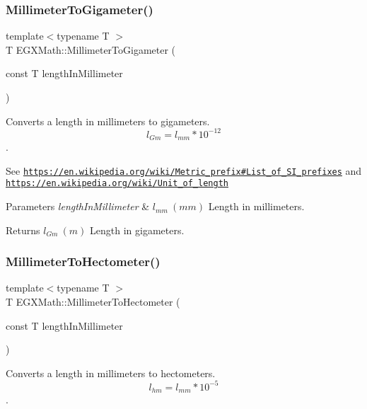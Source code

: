 \subsubsection{\texorpdfstring{Millimeter\+To\+Gigameter()}{MillimeterToGigameter()}}
{\footnotesize\ttfamily template$<$typename T $>$ \\
T E\+G\+X\+Math\+::\+Millimeter\+To\+Gigameter (\begin{DoxyParamCaption}\item[{const T}]{length\+In\+Millimeter }\end{DoxyParamCaption})}



Converts a length in millimeters to gigameters. \[ l_{Gm}=l_{mm} * 10^{-12} \]. 

See \href{https://en.wikipedia.org/wiki/Metric_prefix#List_of_SI_prefixes}{\tt https\+://en.\+wikipedia.\+org/wiki/\+Metric\+\_\+prefix\#\+List\+\_\+of\+\_\+\+S\+I\+\_\+prefixes} and \href{https://en.wikipedia.org/wiki/Unit_of_length}{\tt https\+://en.\+wikipedia.\+org/wiki/\+Unit\+\_\+of\+\_\+length} 
\begin{DoxyParams}{Parameters}
{\em length\+In\+Millimeter} & $ l_{mm}\ (mm)$ Length in millimeters. \\
\hline
\end{DoxyParams}
\begin{DoxyReturn}{Returns}
$ l_{Gm}\ (m)$ Length in gigameters. 
\end{DoxyReturn}
\mbox{\label{group___e_g_x_math-_conversions-_length_conversions-_millimeter-_s_i_gaa4a0a12379c507ce0ffb4a950174980c}} 
\subsubsection{\texorpdfstring{Millimeter\+To\+Hectometer()}{MillimeterToHectometer()}}
{\footnotesize\ttfamily template$<$typename T $>$ \\
T E\+G\+X\+Math\+::\+Millimeter\+To\+Hectometer (\begin{DoxyParamCaption}\item[{const T}]{length\+In\+Millimeter }\end{DoxyParamCaption})}



Converts a length in millimeters to hectometers. \[ l_{hm}=l_{mm} * 10^{-5} \]. 

